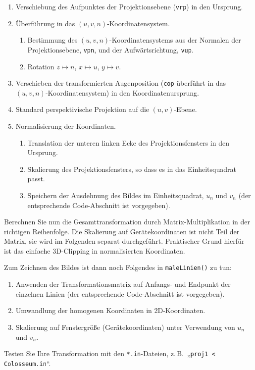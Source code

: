 \begin{enumerate}
  \item Verschiebung des Aufpunktes der Projektionsebene (\texttt{vrp})
        in den Ursprung.
  \item Überführung in das $(u, v, n)$-Koordinatensystem.
  \begin{enumerate}
    \item Bestimmung des $(u, v, n)$-Koordinatensystems aus der
          Normalen der Projektionsebene, \texttt{vpn}, und der
          Aufwärtsrichtung, \texttt{vup}.
    \item Rotation $z ↦ n$, $x ↦ u$, $y ↦ v$.
  \end{enumerate}
  \item Verschieben der transformierten Augenposition (\texttt{cop}
        überführt in das $(u, v, n)$-Ko\-or\-di\-na\-ten\-sys\-tem) in
        den Koordinatenursprung. 
  \item Standard perspektivische Projektion auf die $(u, v)$-Ebene.
  \item Normalisierung der Koordinaten.
  \begin{enumerate}
    \item Translation der unteren linken Ecke des Projektionsfensters 
          in den Ursprung.
    \item Skalierung des Projektionsfensters, so dass es in das 
          Einheitsquadrat passt.
    \item Speichern der Ausdehnung des Bildes im Einheitsquadrat,
          $u_n$ und $v_n$ (der entsprechende Code-Abschnitt ist
          vorgegeben).
  \end{enumerate}
\end{enumerate}

Berechnen Sie nun die Gesamttransformation durch Matrix-Multiplikation 
in der richtigen Reihenfolge. Die Skalierung auf Gerätekoordinaten ist 
nicht Teil der Matrix, sie wird im Folgenden separat durchgeführt.
Praktischer Grund hierfür ist das einfache 3D-Clipping in normalisierten
Koordinaten.

Zum Zeichnen des Bildes ist dann noch Folgendes in \texttt{maleLinien()}
zu tun:
\begin{enumerate}
  \item Anwenden der Transformationsmatrix auf Anfangs- und Endpunkt der 
        einzelnen Linien (der entsprechende Code-Abschnitt ist 
        vorgegeben).
  \item Umwandlung der homogenen Koordinaten in 2D-Koordinaten.
  \item Skalierung auf Fenstergröße (Gerätekoordinaten) unter Verwendung 
        von $u_n$ und $v_n$.
\end{enumerate}

Testen Sie Ihre Transformation mit den \texttt{*.in}-Dateien,
z.\,B.\ „\texttt{proj1 < Colosseum.in}“.
